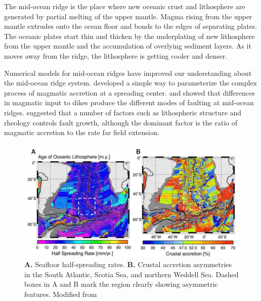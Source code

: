 \documentclass[letterpaper,12pt,notitle]{memphisthesis}                     %
\begin{document}
 The mid-ocean ridge is the place where new oceanic crust and lithosphere are generated by partial melting of the upper mantle. Magma rising from the upper mantle extrudes onto the ocean floor and bonds to the edges of separating plates. The oceanic plates start thin and thicken by the underplating of new lithosphere from the upper mantle and the accumulation of overlying sediment layers. As it moves away from the ridge, the lithosphere is getting cooler and denser.


Numerical models for mid-ocean ridges have improved our understanding about the mid-ocean ridge system. 
\citet{Buck1998} developed a simple way to parameterize the complex process of magmatic accretion at a spreading center. \citet{Buck2005} and \citet{Tucholke2008} showed that differences in magmatic input to dikes produce the different modes of faulting at mid-ocean ridges. \citet{Behn2008} suggested that a number of factors such as lithospheric structure and rheology controls fault growth, although the dominant factor is the ratio of magmatic accretion to the rate far field extension.

\begin{figure}[!htb]
	\centering
	\includegraphics[width=0.9\linewidth]{./figs/hsr_muller.png}
	\caption{\textbf{A.} Seafloor half-spreading rates. \textbf{B.} Crustal accretion asymmetries in the South Atlantic, Scotia Sea, and northern Weddell Sea. Dashed boxes in A and B mark the region clearly showing asymmetric features. Modified from \citet{Muller2008}}
	\label{fig:hsr_muller}
\end{figure}
\end{document}
